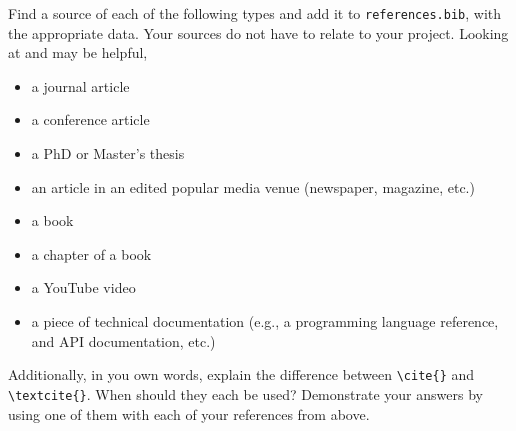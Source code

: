 \documentclass[10pt,twocolumn]{article}
\begin{document}
Find a source of each of the following types and add it to \texttt{references.bib}, with the appropriate data. Your sources do not have to relate to your project. Looking at \textcite{OverleafBibliographyManagement} and \textcite{WikipediaBibtex} may be helpful,

\begin{itemize}
\item a journal article
\item a conference article
\item a PhD or Master's thesis
\item an article in an edited popular media venue (newspaper, magazine, etc.)
\item a book
\item a chapter of a book
\item a YouTube video
\item a piece of technical documentation (e.g., a programming language reference, and API documentation, etc.)
\end{itemize}

Additionally, in you own words, explain the difference between \texttt{{\textbackslash}cite\{\}} and \texttt{{\textbackslash}textcite\{\}}. When should they each be used? Demonstrate your answers by using one of them with each of your references from above.

\printbibliography
\end{document}
